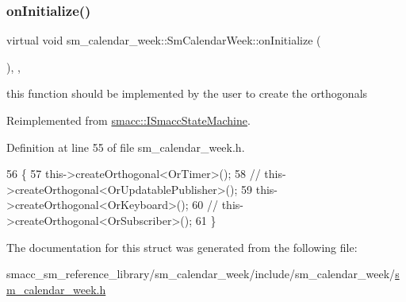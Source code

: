 \subsubsection{\texorpdfstring{on\+Initialize()}{onInitialize()}}
{\footnotesize\ttfamily virtual void sm\+\_\+calendar\+\_\+week\+::\+Sm\+Calendar\+Week\+::on\+Initialize (\begin{DoxyParamCaption}{ }\end{DoxyParamCaption})\hspace{0.3cm}{\ttfamily [inline]}, {\ttfamily [override]}, {\ttfamily [virtual]}}



this function should be implemented by the user to create the orthogonals 



Reimplemented from \hyperlink{classsmacc_1_1ISmaccStateMachine_ac2982c6c8283663e5e1e8a7c82f511ec}{smacc\+::\+I\+Smacc\+State\+Machine}.



Definition at line 55 of file sm\+\_\+calendar\+\_\+week.\+h.


\begin{DoxyCode}
56     \{
57         this->createOrthogonal<OrTimer>();
58         \textcolor{comment}{// this->createOrthogonal<OrUpdatablePublisher>();}
59         this->createOrthogonal<OrKeyboard>();
60         \textcolor{comment}{// this->createOrthogonal<OrSubscriber>();}
61     \}
\end{DoxyCode}


The documentation for this struct was generated from the following file\+:\begin{DoxyCompactItemize}
\item 
smacc\+\_\+sm\+\_\+reference\+\_\+library/sm\+\_\+calendar\+\_\+week/include/sm\+\_\+calendar\+\_\+week/\hyperlink{sm__calendar__week_8h}{sm\+\_\+calendar\+\_\+week.\+h}\end{DoxyCompactItemize}
